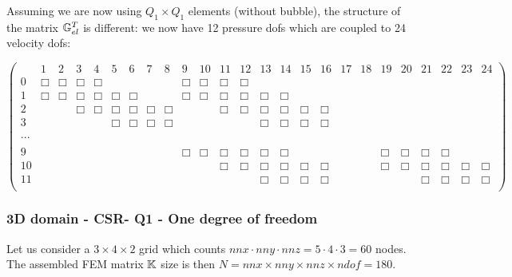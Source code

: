 Assuming we are now using $Q_1\times Q_1$ elements (without bubble), 
the structure of the matrix ${\mathbb{G}}_{el}^T$ is different: we now have 12 pressure dofs 
which are coupled to 24 velocity dofs:
\begin{scriptsize}
\begin{equation}
\left(
\begin{array}{ccccccccccccccccccccccccc}
 & 1 & 2 & 3 & 4 & 5 & 6 & 7 & 8 & 9 & 10 & 11 & 12 & 13 & 14 & 15 & 16 & 17 & 18 & 19 & 20 & 21 & 22 & 23 & 24    \\
0 &\Box&\Box & \Box&\Box &  &  &  &  & \Box&\Box & \Box&\Box &  &  &  &  &  &  &  &  &  &  &  &  \\
1 & \Box&\Box & \Box&\Box & \Box  & \Box  &  &  & \Box&\Box & \Box&\Box & \Box  & \Box  &  &  &  &  &  &  &  &  &  & \\
2 &  & & \Box&\Box & \Box  & \Box  & \Box  & \Box  & & & \Box&\Box & \Box  & \Box  & \Box  &\Box  &  &  &  &  &  &  &  & \\ 
3 &  & & &  & \Box  & \Box  & \Box  & \Box  & & & & & \Box  & \Box  & \Box  &\Box  &  &  &  &  &  &  &  & \\ 
\\
... \\
\\
9 & & & & & & & & &\Box &\Box &\Box &\Box & \Box  & \Box &  &  & & &\Box &\Box & \Box &\Box & &  \\
10 & & & & & & & & & & &\Box &\Box & \Box  & \Box & \Box & \Box & & &\Box &\Box & \Box &\Box &\Box & \Box \\
11 & & & & & & & & & & & & & \Box  & \Box & \Box & \Box & & & & & \Box &\Box &\Box & \Box \\
\end{array}
\right)
\end{equation} 
\end{scriptsize}




\subsubsection{3D domain - CSR- Q1 - One degree of freedom}

Let us consider a $3\times4\times2$ grid which counts 
$nnx\cdot nny \cdot nnz = 5 \cdot 4\cdot 3=60$ nodes.
The assembled FEM matrix ${\mathbb{K}}$ size is then 
$N=nnx\times nny\times nnz \times ndof=180$.

\begin{center}

\end{center}



